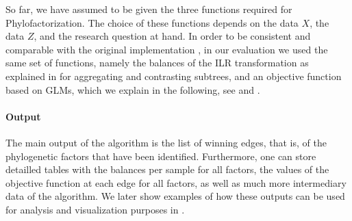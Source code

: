So far, we have assumed to be given the three functions required for Phylofactorization.
The choice of these functions depends on the data $X$, the data $Z$, and the research question at hand.
In order to be consistent and comparable with the original implementation \cite{Washburne2017a},
in our evaluation we used the same set of functions,
namely the balances of the ILR transformation as explained in  for aggregating and contrasting subtrees,
and an objective function based on \acfp{GLM}, 
which we explain in the following, 
see  and .


\paragraph{Output}
\label{sec:Factorization:sub:Methods:sub:Phylofactor:par:Output}

The main output of the algorithm is the list of winning edges, that is, 
of the phylogenetic factors that have been identified.
Furthermore, one can store detailled tables with the balances per sample for all factors,
the values of the objective function at each edge for all factors,
as well as much more intermediary data of the algorithm.
We later show examples of how these outputs can be used for analysis and visualization purposes
in .


